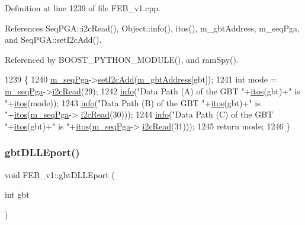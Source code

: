 Definition at line 1239 of file F\+E\+B\+\_\+v1.\+cpp.



References Seq\+P\+G\+A\+::i2c\+Read(), Object\+::info(), itos(), m\+\_\+gbt\+Address, m\+\_\+seq\+Pga, and Seq\+P\+G\+A\+::set\+I2c\+Add().



Referenced by B\+O\+O\+S\+T\+\_\+\+P\+Y\+T\+H\+O\+N\+\_\+\+M\+O\+D\+U\+L\+E(), and ram\+Spy().


\begin{DoxyCode}
1239                                 \{
1240   \hyperlink{classFEB__v1_a6c7804ac86796f233a8393043adf2e77}{m\_seqPga}->\hyperlink{classSeqPGA_a4ef334e4d2cb417b49033dce951728cd}{setI2cAdd}(\hyperlink{classFEB__v1_ac625855df976f16694178f1a4c0eef1e}{m\_gbtAddress}[gbt]);
1241   \textcolor{keywordtype}{int} mode = \hyperlink{classFEB__v1_a6c7804ac86796f233a8393043adf2e77}{m\_seqPga}->\hyperlink{classSeqPGA_a7cd344df2be99f3a02b487f80e87b27e}{i2cRead}(29);
1242   \hyperlink{classObject_a644fd329ea4cb85f54fa6846484b84a8}{info}(\textcolor{stringliteral}{"Data Path (A) of the GBT "}+\hyperlink{Tools_8h_af330027dbdafb9a30768b3613c553e60}{itos}(gbt)+\textcolor{stringliteral}{" is "}+\hyperlink{Tools_8h_af330027dbdafb9a30768b3613c553e60}{itos}(mode));
1243   \hyperlink{classObject_a644fd329ea4cb85f54fa6846484b84a8}{info}(\textcolor{stringliteral}{"Data Path (B) of the GBT "}+\hyperlink{Tools_8h_af330027dbdafb9a30768b3613c553e60}{itos}(gbt)+\textcolor{stringliteral}{" is "}+\hyperlink{Tools_8h_af330027dbdafb9a30768b3613c553e60}{itos}(\hyperlink{classFEB__v1_a6c7804ac86796f233a8393043adf2e77}{m\_seqPga}->
      \hyperlink{classSeqPGA_a7cd344df2be99f3a02b487f80e87b27e}{i2cRead}(30)));
1244   \hyperlink{classObject_a644fd329ea4cb85f54fa6846484b84a8}{info}(\textcolor{stringliteral}{"Data Path (C) of the GBT "}+\hyperlink{Tools_8h_af330027dbdafb9a30768b3613c553e60}{itos}(gbt)+\textcolor{stringliteral}{" is "}+\hyperlink{Tools_8h_af330027dbdafb9a30768b3613c553e60}{itos}(\hyperlink{classFEB__v1_a6c7804ac86796f233a8393043adf2e77}{m\_seqPga}->
      \hyperlink{classSeqPGA_a7cd344df2be99f3a02b487f80e87b27e}{i2cRead}(31)));
1245   \textcolor{keywordflow}{return} mode; 
1246 \}
\end{DoxyCode}
\mbox{\label{classFEB__v1_add5e12a5351c0c4986d24f433155351b}} 
\subsubsection{\texorpdfstring{gbt\+D\+L\+L\+Eport()}{gbtDLLEport()}}
{\footnotesize\ttfamily void F\+E\+B\+\_\+v1\+::gbt\+D\+L\+L\+Eport (\begin{DoxyParamCaption}\item[{int}]{gbt }\end{DoxyParamCaption})}



